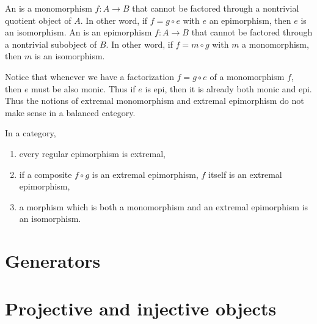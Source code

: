 \begin{defn}
  An  is a monomorphism $f\colon A\to B$  that cannot be factored through a nontrivial quotient object of $A$. In other word, if $f=g\circ e$ with $e$ an epimorphism, then $e$ is an isomorphism.
  An  is an epimorphism $f\colon A\to B$ that cannot be factored through a nontrivial subobject of $B$.  In other word, if $f=m\circ g$ with $m$ a monomorphism, then $m$ is an isomorphism.
\end{defn}
\begin{rem}
  Notice that whenever we have a factorization $f=g\circ e$ of a monomorphism $f$, then $e$ must be also monic. Thus if $e$ is epi, then it is already both monic and epi. Thus the notions of extremal monomorphism and extremal epimorphism do not make sense in a balanced category.
\end{rem}

\begin{prop}
  In a category,
  \begin{enumerate}
    \item every regular epimorphism is extremal,
    \item if a composite $f\circ g$ is an extremal epimorphism, $f$ itself is an extremal epimorphism,
    \item a morphism which is both a monomorphism and an extremal epimorphism is an isomorphism.
  \end{enumerate}
\end{prop}


\section{Generators}

\section{Projective and injective objects}
